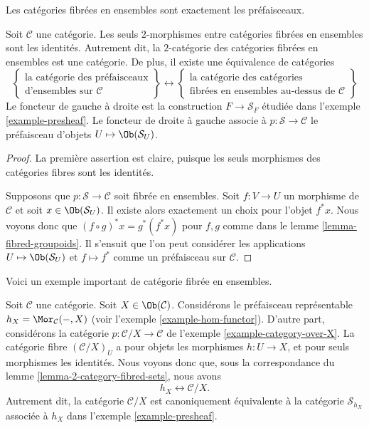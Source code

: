 \begin{lemma}
\label{lemma-2-category-fibred-sets}
\begin{slogan}
Les catégories fibrées en ensembles sont exactement les préfaisceaux.
\end{slogan}
Soit $\mathcal{C}$ une catégorie.
Les seuls $2$-morphismes entre catégories fibrées en ensembles sont les identités.
Autrement dit, la $2$-catégorie des catégories fibrées en ensembles est une catégorie.
De plus, il existe une équivalence de catégories
$$
\left\{
\begin{matrix}
\text{la catégorie des préfaisceaux}\\
\text{d'ensembles sur }\mathcal{C}
\end{matrix}
\right\}
\leftrightarrow
\left\{
\begin{matrix}
\text{la catégorie des catégories}\\
\text{fibrées en ensembles au-dessus de }\mathcal{C}
\end{matrix}
\right\}
$$
Le foncteur de gauche à droite est la construction
$F \to \mathcal{S}_F$ étudiée dans
l'exemple \ref{example-presheaf}.
Le foncteur de droite à gauche associe à $p : \mathcal{S} \to \mathcal{C}$
le préfaisceau d'objets $U \mapsto \Ob(\mathcal{S}_U)$.
\end{lemma}

\begin{proof}
La première assertion est claire, puisque les seuls morphismes des catégories
fibres sont les identités.

\medskip\noindent
Supposons que $p :
\mathcal{S} \to \mathcal{C}$ soit fibrée en ensembles. Soit $f : V \to U$
un morphisme de $\mathcal{C}$ et soit $x \in \Ob(\mathcal{S}_U)$.
Il existe alors exactement un choix pour l'objet $f^\ast x$. Nous voyons donc que
$(f \circ g)^\ast x = g^\ast(f^\ast x)$ pour $f, g$ comme dans le lemme
\ref{lemma-fibred-groupoids}. Il s'ensuit que l'on peut considérer les
applications $U \mapsto \Ob(\mathcal{S}_U)$ et $f \mapsto f^\ast$
comme un préfaisceau sur $\mathcal{C}$.
\end{proof}

\noindent
Voici un exemple important de catégorie fibrée en ensembles.

\begin{example}
\label{example-fibred-category-from-functor-of-points}
Soit $\mathcal{C}$ une catégorie. Soit $X \in \Ob(\mathcal{C})$.
Considérons le préfaisceau représentable $h_X = \Mor_\mathcal{C}(-, X)$
(voir l'exemple \ref{example-hom-functor}).
D'autre part, considérons la catégorie $p : \mathcal{C}/X \to \mathcal{C}$
de l'exemple \ref{example-category-over-X}.
La catégorie fibre $(\mathcal{C}/X)_U$ a pour objets les morphismes
$h : U \to X$, et pour seuls morphismes les identités. Nous voyons donc que,
sous la correspondance du
lemme \ref{lemma-2-category-fibred-sets},
nous avons
$$
h_X \longleftrightarrow \mathcal{C}/X.
$$
Autrement dit, la catégorie $\mathcal{C}/X$ est canoniquement équivalente
à la catégorie $\mathcal{S}_{h_X}$ associée
à $h_X$ dans
l'exemple \ref{example-presheaf}.
\end{example}

